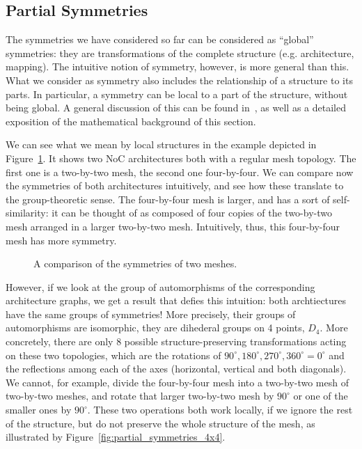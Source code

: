 \subsection{Partial Symmetries}
\label{sec:partial_symmetries}

The symmetries we have considered so far can be considered as ``global'' symmetries: they are transformations of the complete structure (e.g. architecture, mapping).
The intuitive notion of symmetry, however, is more general than this.
What we consider as symmetry also includes the relationship of a structure to its parts.
In particular, a symmetry can be local to a part of the structure, without being global. A general discussion of this can be found in~\cite{lawson_inverse_semigroups}, as well as a detailed exposition of the mathematical background of this section.

We can see what we mean by local structures in the example depicted in Figure~\ref{fig:motivation_partial_symmetries}.
It shows two \ac{NoC} architectures both with a regular mesh topology.
The first one is a two-by-two mesh, the second one four-by-four.
We can compare now the symmetries of both architectures intuitively, and see how these translate to the group-theoretic sense.
The four-by-four mesh is larger, and has a sort of self-similarity: it can be thought of as composed of four copies of the two-by-two mesh arranged in a larger two-by-two mesh.
Intuitively, thus, this four-by-four mesh has more symmetry.

\begin{figure}[h]
	\centering
   \resizebox{0.55\textwidth}{!}{}
	\caption{A comparison of the symmetries of two meshes.}
	\label{fig:motivation_partial_symmetries}
\end{figure}

However, if we look at the group of automorphisms of the corresponding architecture graphs, we get a result that defies this intuition:
both archtiectures have the same groups of symmetries!
More precisely, their groups of automorphisms are isomorphic, they are dihederal groups on 4 points, $D_4$.
More concretely, there are only 8  possible structure-preserving transformations acting on these two topologies, which are the rotations of $90^\circ,180^\circ,270^\circ,360^\circ = 0^\circ$ and the reflections among each of the axes (horizontal, vertical and both diagonals). We cannot, for example, divide the four-by-four mesh into a two-by-two mesh of two-by-two meshes, and rotate that larger two-by-two mesh by $90^\circ$ or one of the smaller ones by $90^\circ$. These two operations both work locally, if we ignore the rest of the structure, but do not preserve the whole structure of the mesh, as illustrated by Figure~\ref{fig:partial_symmetries_4x4}.

